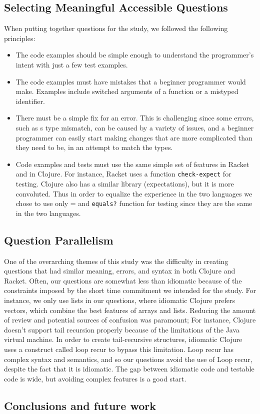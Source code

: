 \documentclass[submission,copyright,creativecommons]{eptcs}
\newcommand{\allcomments}[1]{{#1}}
\newcommand{\hfcomment}[1]{\textcolor{Teal}{\allcomments{Henry: {#1}}}}
\begin{document}
	\subsection{Selecting Meaningful Accessible Questions}\label{sec:meaning}
	When putting together questions for the study, we followed the following principles:
	\begin{itemize}
	\item The code examples should be simple enough to understand the programmer's intent with just a few test examples. 
	\item The code examples must have mistakes that a beginner programmer would make. Examples include switched arguments of a function or a mistyped identifier. 
	\item There must be a simple fix for an error. This is challenging since some errors, such as s type mismatch, can be caused by a variety of issues, and a beginner
	programmer can easily start making changes that are more complicated than they need to be, in an attempt to match the types. 
	\item Code examples and tests must use the same simple set of features in Racket and in Clojure. For instance, Racket uses a function \texttt{check-expect} for testing. Clojure also has a similar library (expectations), but it is more convoluted. Thus in order to equalize the experience in the two languages we chose to use only = and \texttt{equals?} function for testing since they are the same in the two languages. 
	\end{itemize}


	\subsection{Question Parallelism}\label{sec:parallel}
	
	One of the overarching themes of this study was the difficulty in creating questions that had similar meaning, errors, and syntax in both Clojure and Racket. 
	Often, our questions are somewhat less than idiomatic because of the constraints imposed by the short time commitment we intended for the study.
	For instance, we only use lists in our questions, where idiomatic Clojure prefers vectors, which combine the best features of arrays and lists.
	 Reducing the amount of review and potential sources of confusion was paramount; For instance, Clojure doesn't support tail recursion properly because of the limitations of the Java virtual machine.
	 In order to create tail-recursive structures, idiomatic Clojure uses a construct called loop recur to bypass this limitation.
	 Loop recur has complex syntax and semantics, and so our questions avoid the use of Loop recur, despite the fact that it is idiomatic. 
	 The gap between idiomatic code and testable code is wide, but avoiding complex features is a good start. %

\subsection{Conclusions and future work}\label{sec:future}



\end{document}
